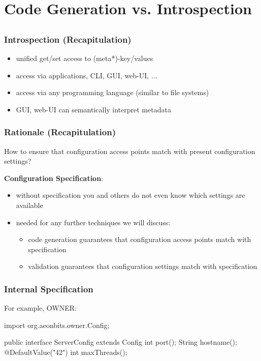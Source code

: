 \section{Code Generation vs. Introspection}

\subsection{}

\begin{frame}
	\frametitle{Introspection (Recapitulation)}
	\pause
	\begin{itemize}
	\item unified get/set access to (meta*)-key/values
	\item access via applications, CLI, GUI, web-UI, ...
	\item access via any programming language (similar to file systems)
	\item GUI, web-UI can semantically interpret metadata
	\end{itemize}
\end{frame}

\begin{frame}
	\frametitle{Rationale (Recapitulation)}
	\begin{task}
	How to ensure that configuration access points match with present configuration settings?
	\end{task}

	\pause

	\textbf{Configuration Specification}:
	\begin{itemize}
	\item without specification you and others do not even know which settings are available
	\item needed for any further techniques we will discuss:
		\begin{itemize}
		\item code generation guarantees that configuration access points match with specification
		\item validation guarantees that configuration settings match with specification
		\end{itemize}
	\end{itemize}
\end{frame}

\begin{frame}[fragile]
	\frametitle{Internal Specification}

	For example, OWNER:
	\begin{code}[gobble=4,language=Java]
	import org.aeonbits.owner.Config;

	public interface ServerConfig extends Config {
		int port();
		String hostname();
		@DefaultValue("42")
		int maxThreads();
	}
	\end{code}
\end{frame}

